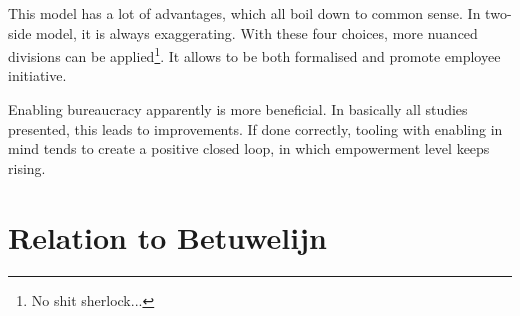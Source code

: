 \documentclass[]{uva-bachelor-thesis}
\def \CurrChapter {}
\def \CurrSection {}
\renewcommand{\chaptermark}[1]{\def \CurrChapter {#1} \def \CurrSection {}}
\begin{document}
This model has a lot of advantages, which all boil down to common sense. 
In two-side model, it is always exaggerating. 
With these four choices, more nuanced divisions can be applied\footnote{No shit sherlock...}. 
It allows to be both formalised and promote employee initiative. 

Enabling bureaucracy apparently is more beneficial. 
In basically all studies presented, this leads to improvements. 
If done correctly, tooling with enabling in mind tends to create a positive closed loop, in which empowerment level keeps rising. 

\section{Relation to Betuwelijn}




\chaptermark{Bibliography}
\end{document}
